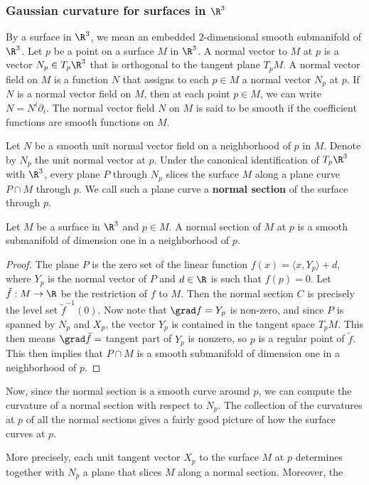 \subsubsection{Gaussian curvature for surfaces in $\R^3$}
By a surface in $\R^3$, we mean an embedded $2$-dimensional smooth submanifold of $\R^3$. Let $p$ be a point on a surface $M$ in $\R^3$. A normal vector to $M$ at $p$ 
is a vector $N_p\in T_p\R^3$ that is orthogonal to the tangent plane $T_pM$. A normal vector field on $M$ is a function $N$ that assigns to each $p\in M$ a normal 
vector $N_p$ at $p$. If $N$ is a normal vector field on $M$, then at each point $p\in M$, we can write $N=N^i\partial_i$. The normal vector field $N$ on $M$ is said to be 
smooth if the coefficient functions are smooth functions on $M$.\par
Let $N$ be a smooth unit normal vector field on a neighborhood of $p$ in $M$. Denote by $N_p$ the unit normal vector at $p$. Under the canonical identification of 
$T_p\R^3$ with $\R^3$, every plane $P$ through $N_p$ slices the surface $M$ along a plane curve $P\cap M$ through $p$. We call such a plane curve a 
\textbf{normal section} of the surface through $p$.
\begin{proposition}
Let $M$ be a surface in $\R^3$ and $p\in M$. A normal section of $M$ at $p$ is a smooth submanifold of dimension one in a neighborhood of $p$.
\end{proposition}
\begin{proof}
The plane $P$ is the zero set of the linear function $f(x)=\langle x,Y_p\rangle+d$, where $Y_p$ is the normal vector of $P$ and $d\in\R$ is such that $f(p)=0$. Let $\tilde{f}:M\to\R$ be the restriction of $f$ to $M$. Then the normal section $C$ is precisely the level set $\tilde{f}^{-1}(0)$. Now note that $\grad f=Y_p$ is non-zero, and since $P$ is spanned by $N_p$ and $X_p$, the vector $Y_p$ is contained in the tangent space $T_pM$. This then means $\grad\tilde{f}=$ tangent part of $Y_p$ is nonzero, so $p$ is a regular point of $\tilde{f}$. This then implies that $P\cap M$ is a smooth submanifold of dimension one in a neighborhood of $p$.
\end{proof}
Now, since the normal section is a smooth curve around $p$, we can compute the curvature of a normal section with respect to $N_p$. The collection of the curvatures 
at $p$ of all the normal sections gives a fairly good picture of how the surface curves at $p$.\par
More precisely, each unit tangent vector $X_p$ to the surface $M$ at $p$ determines together with $N_p$ a plane that slices $M$ along a normal section. Moreover, the 
